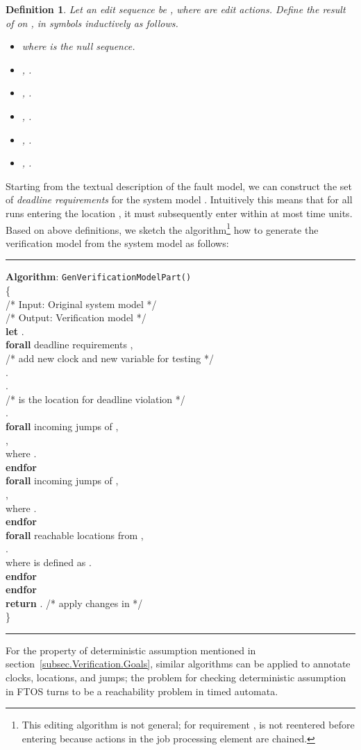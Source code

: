 \documentclass[10pt, a4paper, onecolumn, conference, compsocconf]{IEEEtran}
\newcommand{\procbegin}{\vspace*{3mm}\hrule\vspace{2mm}\noindent}
\newcommand{\procend}{\vspace*{2mm}\hrule\vspace{3mm}}
\newcommand{\hstt}{\\\hspace*{4mm}}
\newcommand{\hstttt}{\\\hspace*{8mm}}
\newcommand{\hstttttt}{\\\hspace*{12mm}}
\newcommand{\hstttttttt}{\\\hspace*{16mm}}
\newtheorem{defi}{Definition}
\begin{document}
\begin{defi}
Let an edit sequence be , where  are edit actions.
Define the result of  on , in symbols  inductively as follows.
\begin{itemize}
\item  where  is the null sequence.
\item ,  .
\item , .
\item , .

\item , .
\item ,   .
\end{itemize}
\end{defi}

Starting from the textual description of the fault model, we can construct the set of \emph{deadline requirements}  for the system
model . Intuitively this means that for all runs entering the location , it must subsequently enter  within at most  time units.
Based on above definitions, we sketch the algorithm\footnote{This editing algorithm is not general;  for requirement ,  is not reentered before entering  because actions in the job processing element are chained.} how to generate the verification model from the system model as follows:
\begin{small}
\procbegin
\textbf{Algorithm}: \verb"GenVerificationModelPart()"\\
\{
\hstt /* Input: Original system model  */
\hstt /* Output: Verification model  */
\hstt \textbf{let} .
\hstt \textbf{forall} deadline requirements ,
\hstt /* add new clock and new variable for testing */
\hstttt.
\hstttt.
\hstt /*  is the location for deadline violation */
\hstttt.
\hstttt \textbf{forall} incoming jumps  of ,
\hstttttt ,
\hstttttttt where .
\hstttt \textbf{endfor}
\hstttt \textbf{forall} incoming jumps  of ,
\hstttttt ,
\hstttttttt where .
\hstttt \textbf{endfor}
\hstttt \textbf{forall} reachable locations  from ,
\hstttttt .
\hstttttttt where  is defined as .
\hstttt \textbf{endfor}
\hstt \textbf{endfor}
\hstt \textbf{return} . /* apply changes in  */
\\\}
\procend
\end{small}

For the property of deterministic assumption mentioned in section~\ref{subsec.Verification.Goals}, similar algorithms can be applied to annotate clocks, locations, and jumps; the problem for checking deterministic assumption in FTOS turns to be a reachability problem in timed automata.
\end{document}
